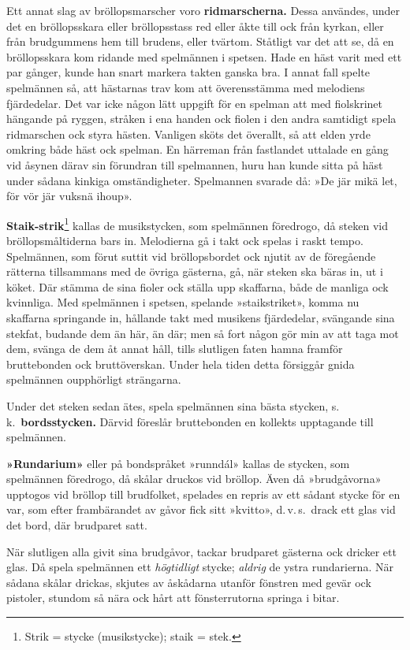 \begin{multicols}{2}
Ett annat slag av bröllopsmarscher voro \textbf{ridmarscherna.} Dessa
användes, under det en bröllopsskara eller bröllopsstass red eller
åkte till ock från kyrkan, eller från brudgummens hem till brudens,
eller tvärtom. Ståtligt var det att se, då en bröllopsskara kom ridande
med spelmännen i spetsen. Hade en häst varit med ett par gånger, kunde
han snart markera takten ganska bra. I annat fall spelte spelmännen
så, att hästarnas trav kom att överensstämma med melodiens fjärdedelar.
Det var icke någon lätt uppgift för en spelman att med fiolskrinet
hängande på ryggen, stråken i ena handen ock fiolen i den andra samtidigt
spela ridmarschen ock styra hästen. Vanligen sköts det överallt, så
att elden yrde omkring både häst ock spelman. En härreman från fastlandet
uttalade en gång vid åsynen därav sin förundran till spelmannen, huru
han kunde sitta på häst under sådana kinkiga omständigheter. Spelmannen
svarade då: »De jär mikä let, för vör jär vuksnä ihoup».

\textbf{Staik-strik}\footnote{Strik = stycke (musikstycke); staik = stek.}
kallas de musikstycken, som spelmännen föredrogo, då steken vid bröllops\-mål\-tid\-erna
bars in. Melodierna gå i  takt ock spelas i raskt tempo.
Spelmännen, som förut suttit vid bröllopsbordet ock njutit av de föregående
rätterna tillsammans med de övriga gästerna, gå, när steken ska bäras
in, ut i köket. Där stämma de sina fioler ock ställa upp skaffarna,
både de manliga ock kvinnliga. Med spelmännen i spetsen, spelande
»staikstriket», komma nu skaffarna springande in, hållande takt med
musikens fjärdedelar, svängande sina stekfat, budande dem än här,
än där; men så fort någon gör min av att taga mot dem, svänga de dem
åt annat håll, tills slutligen faten hamna framför bruttebonden ock
bruttöverskan. Under hela tiden detta försiggår gnida spelmännen oupphörligt
strängarna.

Under det steken sedan ätes, spela spelmännen sina bästa stycken,
s.\,k.\ \textbf{bordsstycken.} Därvid föreslår bruttebonden en kollekts
upptagande till spelmännen.

\textbf{»Rundarium»} eller på bondspråket »runndál» kallas de stycken,
som spelmännen föredrogo, då skålar druckos vid bröllop. Även då »brudgåvorna»
upptogos vid bröllop till brudfolket, spelades en repris av ett sådant
stycke för en var, som efter frambärandet av gåvor fick sitt »kvitto»,
d.\,v.\,s.\ drack ett glas vid det bord, där brudparet satt.

När slutligen alla givit sina brudgåvor, tackar brudparet gästerna
ock dricker ett glas. Då spela spelmännen ett \textit{högtidligt}
stycke; \textit{aldrig} de ystra rundarierna. När sådana skålar drickas,
skjutes av åskådarna utanför fönstren med gevär ock pistoler, stundom
så nära ock hårt att fönsterrutorna springa i bitar.

\end{multicols}
\restoregeometry
\fancyhfoffset[E,O]{0pt}
\clearpage
\pagestyle{fancy}



